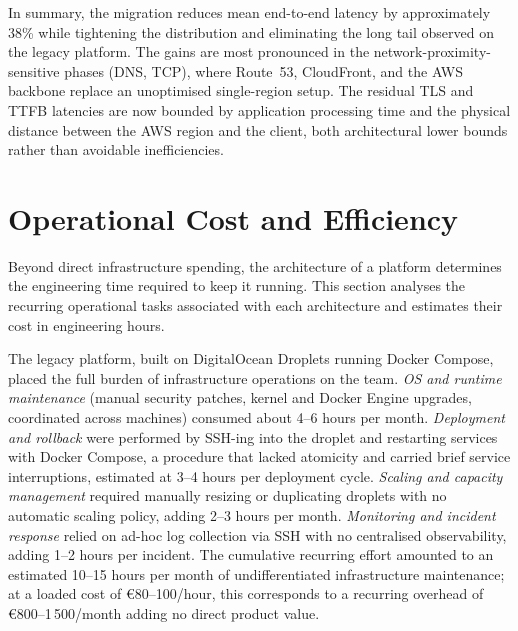In summary, the migration reduces mean end-to-end latency by approximately 38\% while tightening the distribution and eliminating the long tail observed on the legacy platform. The gains are most pronounced in the network-proximity-sensitive phases (DNS, TCP), where Route~53, CloudFront, and the AWS backbone replace an unoptimised single-region setup. The residual TLS and TTFB latencies are now bounded by application processing time and the physical distance between the AWS region and the client, both architectural lower bounds rather than avoidable inefficiencies.

\section{Operational Cost and Efficiency}
\label{sec:operational}
Beyond direct infrastructure spending, the architecture of a platform determines the engineering time required to keep it running. This section analyses the recurring operational tasks associated with each architecture and estimates their cost in engineering hours.

The legacy platform, built on DigitalOcean Droplets running Docker Compose, placed the full burden of infrastructure operations on the team. \emph{OS and runtime maintenance} (manual security patches, kernel and Docker Engine upgrades, coordinated across machines) consumed about 4--6 hours per month. \emph{Deployment and rollback} were performed by SSH-ing into the droplet and restarting services with Docker Compose, a procedure that lacked atomicity and carried brief service interruptions, estimated at 3--4 hours per deployment cycle. \emph{Scaling and capacity management} required manually resizing or duplicating droplets with no automatic scaling policy, adding 2--3 hours per month. \emph{Monitoring and incident response} relied on ad-hoc log collection via SSH with no centralised observability, adding 1--2 hours per incident. The cumulative recurring effort amounted to an estimated 10--15 hours per month of undifferentiated infrastructure maintenance; at a loaded cost of €80--100/hour, this corresponds to a recurring overhead of €800--1\,500/month adding no direct product value.

